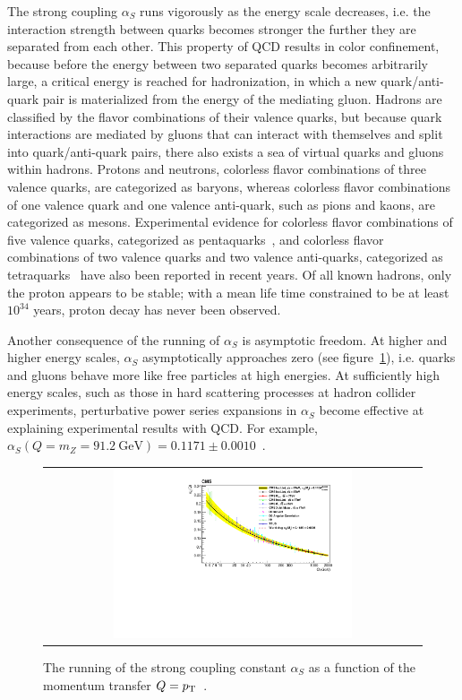 The strong coupling $\alpha_S$ runs vigorously as the energy scale decreases, i.e. the interaction strength between quarks becomes stronger the further they are separated from each other.
This property of QCD results in color confinement, because before the energy between two separated quarks becomes arbitrarily large, a critical energy is reached for hadronization, in which a new quark/anti-quark pair is materialized from the energy of the mediating gluon.
Hadrons are classified by the flavor combinations of their valence quarks, but because quark interactions are mediated by gluons that can interact with themselves and split into quark/anti-quark pairs, there also exists a sea of virtual quarks and gluons within hadrons.
Protons and neutrons, colorless flavor combinations of three valence quarks, are categorized as baryons, whereas colorless flavor combinations of one valence quark and one valence anti-quark, such as pions and kaons, are categorized as mesons.
Experimental evidence for colorless flavor combinations of five valence quarks, categorized as pentaquarks~\cite{PhysRevLett.115.072001}, and colorless flavor combinations of two valence quarks and two valence anti-quarks, categorized as tetraquarks~\cite{PhysRevLett.110.252002} have also been reported in recent years.
Of all known hadrons, only the proton appears to be stable; with a mean life time constrained to be at least $10^{34}$ years, proton decay has never been observed.

Another consequence of the running of $\alpha_S$ is asymptotic freedom.
At higher and higher energy scales, $\alpha_S$ asymptotically approaches zero (see figure~\ref{alphaS_running}), i.e. quarks and gluons behave more like free particles at high energies.
At sufficiently high energy scales, such as those in hard scattering processes at hadron collider experiments, perturbative power series expansions in $\alpha_S$ become effective at explaining experimental results with QCD.
For example, $\alpha_S(Q = m_Z =  \SI{91.2}{\GeV}) = 0.1171 \pm 0.0010$~\cite{PhysRevD.103.034028}.
\begin{figure}[!htb]
  \begin{center}
    \begin{tabular}{c}
        \includegraphics[width=0.65\textwidth]{fig_Theory/alphaS_running.pdf}
    \end{tabular}
    \caption{The running of the strong coupling constant $\alpha_S$ as a function of the momentum transfer $Q = p_{\mathrm{T}}$~\cite{alphaS_running}.
            }
    \label{alphaS_running}
  \end{center}
\end{figure}

